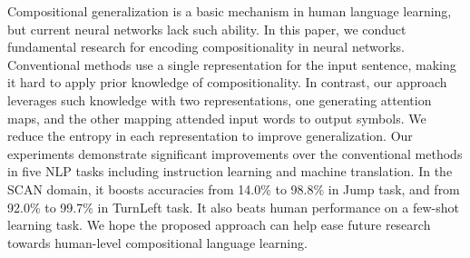 Compositional generalization is a basic mechanism in human language learning, but current neural networks lack such ability. In this paper, we conduct fundamental research for encoding compositionality in neural networks. Conventional methods use a single representation for the input sentence, making it hard to apply prior knowledge of compositionality. In contrast, our approach leverages such knowledge with two representations, one generating attention maps, and the other mapping attended input words to output symbols. We reduce the entropy in each representation to improve generalization. Our experiments demonstrate significant improvements over the conventional methods in five NLP tasks including instruction learning and machine translation. In the SCAN domain, it boosts accuracies from 14.0\% to 98.8\% in Jump task, and from 92.0\% to 99.7\% in TurnLeft task. It also beats human performance on a few-shot learning task. We hope the proposed approach can help ease future research towards human-level compositional language learning.